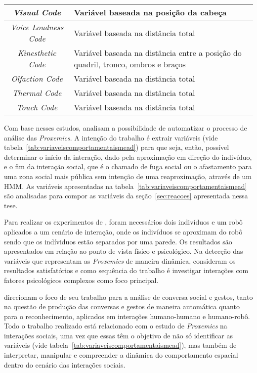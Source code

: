 \begin{table}[!ht]
\begin{tabular}{c | p{8 cm}}
		\hline
		\emph{Visual Code} & Variável baseada na posição da cabeça \\
		\hline
		\emph{Voice Loudness Code} & Variável baseada na distância total \\
		\hline
		\emph{Kinesthetic Code} & Variável baseada na distância entre a posição do quadril, tronco, ombros e braços \\
		\hline
		\emph{Olfaction Code} & Variável baseada na distância total \\
		\hline
		\emph{Thermal Code} & Variável baseada na distância total\\
		\hline
		\emph{Touch Code} & Variável baseada na distância total\\
		\hline
	\end{tabular}
\end{table}

Com base nesses estudos, \textcite{mead:2013} analisam a possibilidade de automatizar o processo de análise das \emph{Proxemics}. A intenção do trabalho é extrair variáveis (vide tabela~\ref{tab:variaveiscomportamentaismead}) para que seja, então, possível determinar o início da interação, dado pela aproximação em direção do indivíduo, e o fim da interação social, que é o chamado de fuga social ou o afastamento para uma zona social mais pública sem intenção de uma reaproximação, através de um HMM. As variáveis apresentadas na tabela~\ref{tab:variaveiscomportamentaismead} são analisadas para compor as variáveis da seção~\ref{sec:reacoes} apresentada nessa tese.

Para realizar os experimentos de \textcite{mead:2013}, foram necessários dois indivíduos e um robô aplicados a um cenário de interação, onde os indivíduos se aproximam do robô sendo que os indíviduos estão separados por uma parede. Os resultados são apresentados em relação ao ponto de vista físico e psicológico. Na detecção das variáveis que representam as \emph{Proxemics} de maneira dinâmica, \textcite{mead:2013} consideram os resultados satisfatórios e como sequência do trabalho é investigar interações com fatores psicológicos complexos como foco principal.

\textcite{mead:2014} direcionam o foco de seu trabalho para a análise de conversa social e gestos, tanto na questão de produção das conversas e gestos de maneira automática quanto para o reconhecimento, aplicados em interações humano-humano e humano-robô. Todo o trabalho realizado está relacionado com o estudo de \emph{Proxemics} na interações sociais, uma vez que essas têm o objetivo de não só identificar as variáveis (vide tabela~\ref{tab:variaveiscomportamentaismead}), mas também de interpretar, manipular e compreender a dinâmica do comportamento espacial dentro do cenário das interações sociais.

